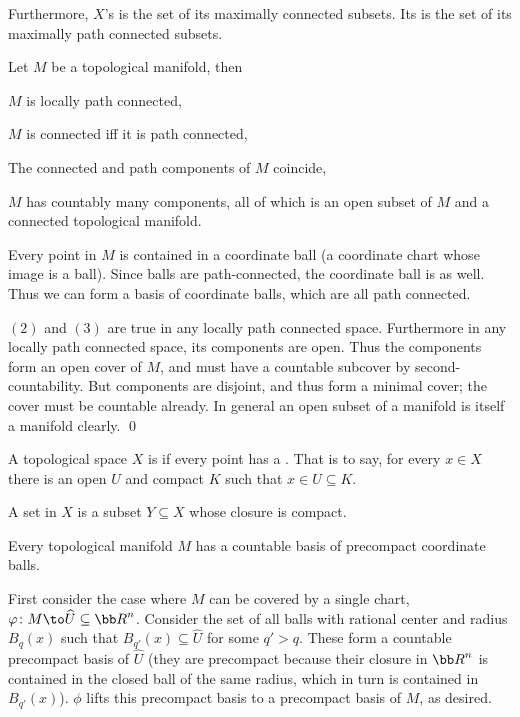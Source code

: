     Furthermore, $X$'s  is the set of its maximally connected subsets.
    Its  is the set of its maximally path connected subsets.

\edefn

\bprop

    Let $M$ be a topological manifold, then
    \benum
        \item $M$ is locally path connected,
        \item $M$ is connected iff it is path connected,
        \item The connected and path components of $M$ coincide,
        \item $M$ has countably many components, all of which is an open subset of $M$ and a connected topological manifold.
    \eenum

\eprop

\bproof

    Every point in $M$ is contained in a coordinate ball (a coordinate chart whose image is a ball).
    Since balls are path-connected, the coordinate ball is as well.
    Thus we can form a basis of coordinate balls, which are all path connected.

    $(2)$ and $(3)$ are true in any locally path connected space.
    Furthermore in any locally path connected space, its components are open.
    Thus the components form an open cover of $M$, and must have a countable subcover by second-countability.
    But components are disjoint, and thus form a minimal cover; the cover must be countable already.
    In general an open subset of a manifold is itself a manifold clearly.
    \qed

\eproof

\bdefn

    A topological space $X$ is  if every point has a .
    That is to say, for every $x\in X$ there is an open $U$ and compact $K$ such that $x\in U\subseteq K$.

    A  set in $X$ is a subset $Y\subseteq X$ whose closure is compact.

\edefn

\blemm

    Every topological manifold $M$ has a countable basis of precompact coordinate balls.

\elemm

\bproof

    First consider the case where $M$ can be covered by a single chart, $\phi\colon M\to\hat U\subseteq\bR^n$.
    Consider the set of all balls with rational center and radius $B_q(x)$ such that $B_{q'}(x)\subseteq\hat U$ for some $q'>q$.
    These form a countable precompact basis of $\hat U$ (they are precompact because their closure in $\bR^n$ is contained in the closed ball of the same radius,
    which in turn is contained in $B_{q'}(x)$).
    $\phi$ lifts this precompact basis to a precompact basis of $M$, as desired.

